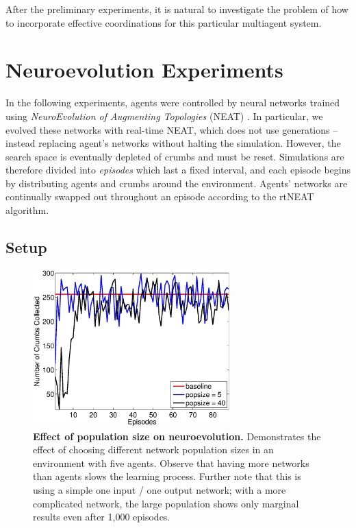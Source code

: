 \documentclass[conference]{IEEEtran}
\begin{document}
After the preliminary experiments, it is natural to investigate the problem of
how to incorporate effective coordinations for this particular multiagent
system.



\section{Neuroevolution Experiments}
\label{section:neuro}

In the following experiments, agents were controlled by neural networks
trained using \textit{NeuroEvolution of Augmenting Topologies} (NEAT)
\cite{stanley2002evolving}.
In particular, we evolved these networks with real-time NEAT, which does not use generations -- instead replacing agent's networks without halting the simulation. However, the search space is eventually depleted of crumbs and must be reset. Simulations are therefore divided into \textit{episodes} which last a fixed interval, and  each episode begins by distributing agents and crumbs around the environment. Agents' networks are continually swapped out throughout an episode according to the rtNEAT algorithm.

\subsection{Setup}

\begin{figure}[!t]
\centering
\includegraphics[width=3.0in]{./figures/neroevolution/pop_size.eps}
\caption{\textbf{Effect of population size on neuroevolution.} Demonstrates the effect of choosing different network population sizes in an environment with five agents. Observe that having more networks than agents slows the learning process. Further note that this is using a simple one input / one output network; with a more complicated network, the large population shows only marginal results even after 1,000 episodes.}
\label{neroevolution:pop_size}
\end{figure}
\end{document}
